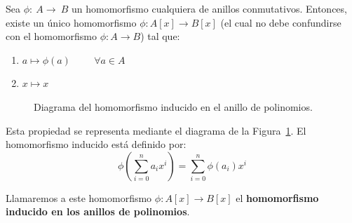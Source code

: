\begin{teo}
    Sea $\phi:~A\longrightarrow~B$ un homomorfismo cualquiera de anillos conmutativos. Entonces, existe un único homomorfismo $\phi:A[x]\longrightarrow B[x]$ (el cual no debe confundirse con el homomorfismo $\phi:A\longrightarrow B$) tal que:
    \begin{enumerate}
        \item $a \longmapsto \phi(a) \hspace{1cm} \forall a \in A$
        \item $x \longmapsto x$
    \end{enumerate}
    \begin{figure}[h]
        \centering
        \caption{Diagrama del homomorfismo inducido en el anillo de polinomios.}
        \label{fig:homomorfismo_inducido}
    \end{figure}

    Esta propiedad se representa mediante el diagrama de la Figura~\ref{fig:homomorfismo_inducido}. El homomorfismo inducido está definido por:
    $$\phi\left( \sum_{i=0}^n a_i x^i \right) = \sum_{i=0}^n \phi(a_i) x^i$$
    
    Llamaremos a este homomorfismo $\phi:A[x]\longrightarrow B[x]$ el \textbf{homomorfismo inducido en los anillos de polinomios}.
\end{teo}
